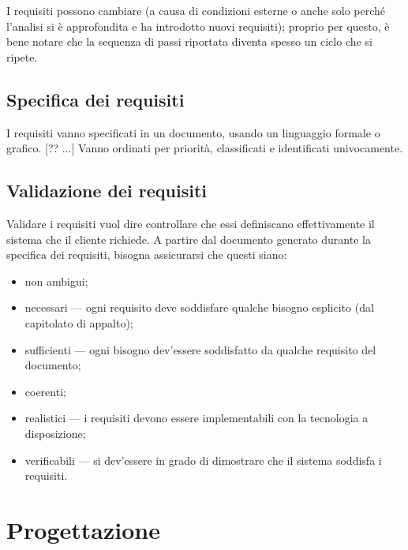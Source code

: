 \documentclass[a4paper]{article}
\begin{document}
		
I requisiti possono cambiare (a causa di condizioni esterne o anche solo perché l'analisi si è approfondita e ha introdotto nuovi requisiti); proprio per questo, è bene notare che la sequenza di passi riportata diventa spesso un ciclo che si ripete.

		
	\subsection{Specifica dei requisiti}

		
I requisiti vanno specificati in un documento, usando un linguaggio formale o grafico. [?? ...] Vanno ordinati per priorità, classificati e identificati univocamente.

		
	\subsection{Validazione dei requisiti}

		
Validare i requisiti vuol dire controllare che essi definiscano effettivamente il sistema che il cliente richiede. A partire dal documento generato durante la specifica dei requisiti, bisogna assicurarsi che questi siano:
		
	\begin{itemize}
		
			
	\item non ambigui;
			
	\item necessari — ogni requisito deve soddisfare qualche bisogno esplicito (dal capitolato di appalto);
			
	\item sufficienti — ogni bisogno dev'essere soddisfatto da qualche requisito del documento;
			
	\item coerenti;
			
	\item realistici — i requisiti devono essere implementabili con la tecnologia a disposizione;
			
	\item verificabili — si dev'essere in grado di dimostrare che il sistema soddisfa i requisiti.
		
	\end{itemize}

	


		
	\section{Progettazione}
\end{document}
